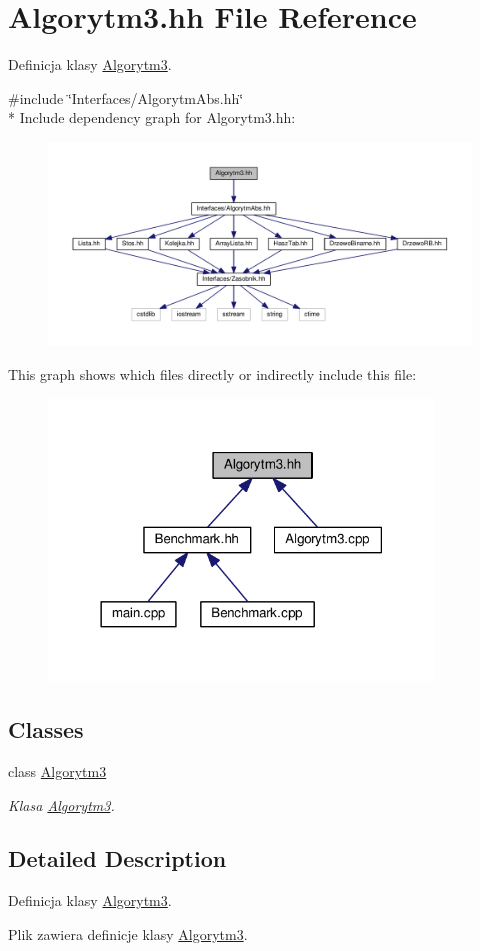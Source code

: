 \hypertarget{a00025}{}\section{Algorytm3.\+hh File Reference}
\label{a00025}


Definicja klasy \hyperlink{a00004}{Algorytm3}.  


{\ttfamily \#include \char`\"{}Interfaces/\+Algorytm\+Abs.\+hh\char`\"{}}\\*
Include dependency graph for Algorytm3.\+hh\+:
\nopagebreak
\begin{figure}[H]
\begin{center}
\leavevmode
\includegraphics[width=350pt]{a00067}
\end{center}
\end{figure}
This graph shows which files directly or indirectly include this file\+:
\nopagebreak
\begin{figure}[H]
\begin{center}
\leavevmode
\includegraphics[width=290pt]{a00068}
\end{center}
\end{figure}
\subsection*{Classes}
\begin{DoxyCompactItemize}
\item 
class \hyperlink{a00004}{Algorytm3}
\begin{DoxyCompactList}\small\item\em Klasa \hyperlink{a00004}{Algorytm3}. \end{DoxyCompactList}\end{DoxyCompactItemize}


\subsection{Detailed Description}
Definicja klasy \hyperlink{a00004}{Algorytm3}. 

Plik zawiera definicje klasy \hyperlink{a00004}{Algorytm3}. 